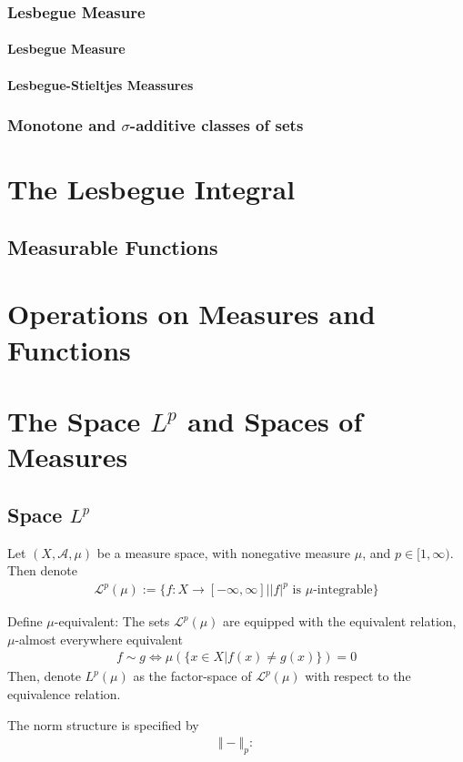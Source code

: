 \documentclass[Total.tex]{subfiles}
\begin{document}
			\subsection{Lesbegue Measure}
				\subsubsection{Lesbegue Measure}
				\subsubsection{Lesbegue-Stieltjes Meassures}
			\subsection{Monotone and $\sigma$-additive classes of sets}
	\chapter{The Lesbegue Integral}
		\section{Measurable Functions}
	\chapter{Operations on Measures and Functions}
	\chapter{The Space $L^p$ and Spaces of Measures}
		\section{Space $L^p$}
			\begin{Def}
				Let $(X,\mathcal{A},\mu)$ be a measure space, with nonegative measure $\mu$, and $p\in [1,\infty)$. Then denote
				\begin{gather*}
					\mathcal{L}^p(\mu):=\{f:X\rightarrow [-\infty,\infty]||f|^p\mbox{ is }\mu\mbox{-integrable}\}
				\end{gather*}
				
				Define $\mu$-equivalent: The sets $\mathcal{L}^p(\mu)$ are equipped with the equivalent relation, $\mu$-almost everywhere equivalent
				\begin{gather*}
					f\sim g\Leftrightarrow \mu(\{x\in X|f(x)\not=g(x)\})=0
				\end{gather*}
				Then, denote $L^p(\mu)$ as the factor-space of $\mathcal{L}^p(\mu)$ with respect to the equivalence relation. 
				
				The norm structure is specified by
				\begin{gather*}
					\Vert-\Vert_p:
				\end{gather*} 
			\end{Def}
\end{document}
